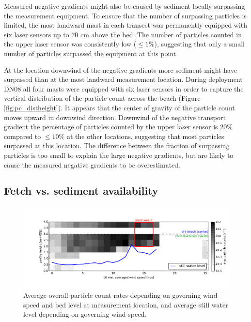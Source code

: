 Measured negative gradients might also be caused by sediment locally
surpassing the measurement equipment. To ensure that the number of
surpassing particles is limited, the most landward mast in each
transect was permanently equipped with six laser sensors up to 70 cm
above the bed. The number of particles counted in the upper laser
sensor was consistently low ($\leq 1\%$), suggesting that only a small
number of particles surpassed the equipment at this point.

At the location downwind of the negative gradients more sediment might
have surpassed than at the most landward measurement location. During
deployment DN08 all four masts were equipped with six laser sensors in
order to capture the vertical distribution of the particle count
across the beach (Figure \ref{fig:pc_distheight}). It appears that the
center of gravity of the particle count moves upward in downwind
direction.%
Downwind of the negative transport gradient the
percentage of particles counted by the upper laser sensor is 20\%
compared to $\leq 10\%$ at the other locations, suggesting that most
particles surpassed at this location. The difference between the
fraction of surpassing particles is too small to explain the large
negative gradients, but are likely to cause the measured negative
gradients to be overestimated.

\subsection{Fetch vs. sediment availability}

\begin{figure}
 \centering
  \includegraphics[width=\columnwidth]{../Figures/particlecounts_velocities}
  \caption{Average overall particle count rates depending on governing
    wind speed and bed level at measurement location, and average
    still water level depending on governing wind speed.}
  \label{fig:pc_velocity}
\end{figure}

